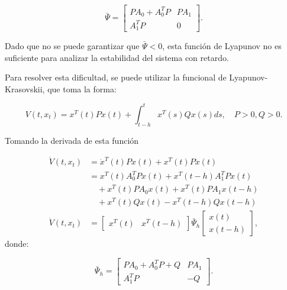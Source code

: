 \documentclass[conference]{IEEEtran}
\begin{document}
\begin{equation}
	\bar{\Psi} = \begin{bmatrix} P A_0 + A_0^T P & P A_1 \\ A_1^T P & 0 \end{bmatrix}.
\end{equation}

Dado que no se puede garantizar que \( \bar{\Psi} < 0 \), esta función de Lyapunov no es suficiente para analizar la estabilidad del sistema con retardo.

Para resolver esta dificultad, se puede utilizar la funcional de Lyapunov-Krasovskii, que toma la forma:

\begin{equation}
	V(t, x_t) = x^T(t) P x(t) + \int_{t-h}^{t} x^T(s) Q x(s) ds, \quad P > 0, Q > 0.
\end{equation}

Tomando la derivada de esta función

\begin{equation}
	\begin{aligned}
		\dot{V}(t, x_t) & = \dot{x}^T(t) P x(t) + x^T(t) P \dot{x}(t)                                                                  \\
		                & = x^T(t) A_0^T P x(t) + x^T(t-h) A_1^T P x(t)                                                                \\
		                & \quad + x^T(t) P A_0 x(t) + x^T(t) P A_1 x(t-h)                                                              \\
		                & \quad + x^T(t) Q x(t) - x^T(t-h) Q x(t-h)                                                                    \\
		\dot{V}(t, x_t) & = \begin{bmatrix} x^T(t) & x^T(t-h) \end{bmatrix} \bar{\Psi}_h \begin{bmatrix} x(t) \\ x(t-h) \end{bmatrix},
	\end{aligned}
\end{equation}
donde:

\begin{equation}
	\bar{\Psi}_h = \begin{bmatrix} P A_0 + A_0^T P + Q & P A_1 \\ A_1^T P & -Q \end{bmatrix}.
\end{equation}
\end{document}
